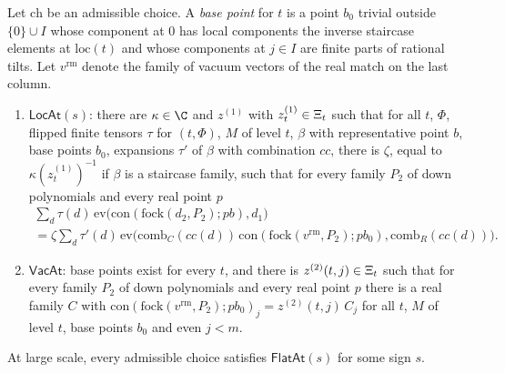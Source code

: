 \begin{definition}\label{def:pf:rowprops:locvac}
Let $\mathrm{ch}$ be an admissible choice. A \emph{base point} for $t$ is a point $b_0$ trivial outside $\{0\}\cup I$ whose
component at $0$ has local components the inverse staircase elements at $\mathrm{loc}(t)$ and whose components at $j\in I$
are finite parts of rational tilts. Let $v^{\mathrm{rm}}$ denote the family of vacuum vectors of the real match on the last
column.
\begin{enumerate}[label=(\alph*)]
\item $\mathsf{LocAt}(s)$: there are $\kappa\in\C$ and $z^{(1)}$ with $z^{(1)}_t\in\Xi_t$ such that for all $t$, $\Phi$,
flipped finite tensors $\tau$ for $(t,\Phi)$, $M$ of level $t$, $\beta$ with representative point $b$, base points $b_0$,
expansions $\tau'$ of $\beta$ with combination $cc$, there is $\zeta$, equal to $\kappa(z^{(1)}_t)^{-1}$ if $\beta$ is a staircase
family, such that for every family $P_2$ of down polynomials and every real point $p$
\begin{multline*}
\sum_d\tau(d)\,\mathrm{ev}\bigl(\mathrm{con}(\mathrm{fock}(d_2,P_2);pb),d_1\bigr)\\
=\zeta\sum_d\tau'(d)\,\mathrm{ev}\bigl(\mathrm{comb}_C(cc(d))\,\mathrm{con}(\mathrm{fock}(v^{\mathrm{rm}},P_2);pb_0),
\mathrm{comb}_R(cc(d))\bigr).
\end{multline*}
\item $\mathsf{VacAt}$: base points exist for every $t$, and there is $z^{(2)}(t,j)\in\Xi_t$ such that for every family
$P_2$ of down polynomials and every real point $p$ there is a real family $C$ with
$\mathrm{con}(\mathrm{fock}(v^{\mathrm{rm}},P_2);pb_0)_j=z^{(2)}(t,j)\,C_j$ for all $t$, $M$ of level $t$, base points $b_0$
and even $j<m$.
\end{enumerate}
\end{definition}

\begin{proposition}\label{pf:rowprops:flatat}
At large scale, every admissible choice satisfies $\mathsf{FlatAt}(s)$ for some sign $s$.
\end{proposition}

